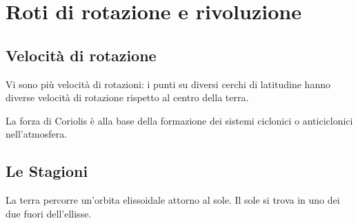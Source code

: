 \documentclass[a4paper]{article}
\begin{document}
\section{Roti di rotazione e rivoluzione}

\subsection{Velocità di rotazione}

Vi sono più velocità di rotazioni: i punti su diversi cerchi di latitudine hanno diverse velocità di rotazione rispetto al centro della terra.



La forza di Coriolis è alla base della formazione dei sistemi ciclonici o anticiclonici nell'atmosfera.

\subsection{Le Stagioni}

La terra percorre un'orbita elissoidale attorno al sole. Il sole si trova in uno dei due fuori dell'ellisse.


\end{document}
